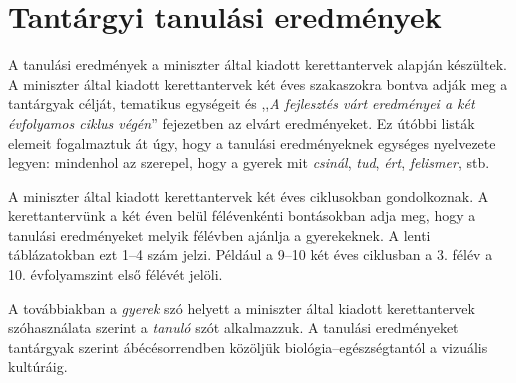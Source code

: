 \documentclass[10pt,a4paper, openright,twoside]{book}
\newcommand{\chaptercover}[1]{
    \cleardoublepage
    
}
\begin{document}



\chaptercover{pics/chapter_covers/6d.JPG}

\chapter{Tantárgyi tanulási eredmények}
\label{sec:tantargyi_tanulasi_eredmenyek}

A tanulási eredmények a miniszter által kiadott kerettantervek \cite{ofi:kerettanterv} alapján készültek. A miniszter által kiadott kerettantervek két éves szakaszokra bontva adják meg a tantárgyak célját, tematikus egységeit és ,,\emph{A fejlesztés várt eredményei a két évfolyamos ciklus végén}'' fejezetben az elvárt eredményeket. Ez útóbbi listák elemeit fogalmaztuk át úgy, hogy a tanulási eredményeknek egységes nyelvezete legyen: mindenhol az szerepel, hogy a gyerek mit \emph{csinál}, \emph{tud}, \emph{ért}, \emph{felismer}, stb.

A miniszter által kiadott kerettantervek két éves ciklusokban gondolkoznak. A kerettantervünk a két éven belül félévenkénti bontásokban adja meg, hogy a tanulási eredményeket melyik félévben ajánlja a gyerekeknek. A lenti táblázatokban ezt 1--4 szám jelzi. Például a 9--10 két éves ciklusban a 3. félév a 10. évfolyamszint első félévét jelöli.

A továbbiakban a \emph{gyerek} szó helyett a miniszter által kiadott kerettantervek szóhasználata szerint a \emph{tanuló} szót alkalmazzuk. A tanulási eredményeket tantárgyak szerint ábécésorrendben közöljük biológia--egész\-ség\-tantól a vizuális kultúráig.


\let\cleardoublepage\clearpage
\backmatter
{}
\label{sec:bibliographyk}


\end{document}
